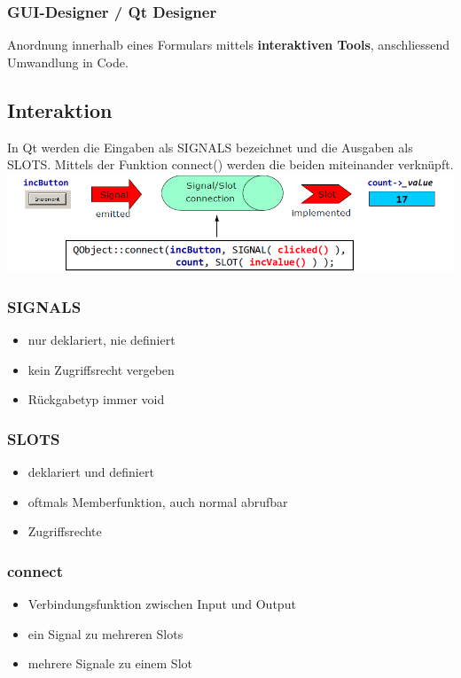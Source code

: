 \subsubsection{GUI-Designer / Qt Designer}	
	Anordnung innerhalb eines Formulars mittels\textbf{ interaktiven Tools}, anschliessend Umwandlung in Code. 	

\subsection{Interaktion}
In Qt werden die Eingaben als SIGNALS bezeichnet und die Ausgaben als SLOTS. Mittels der Funktion connect() werden die beiden miteinander verknüpft.\\
\includegraphics[width=15cm]{images/connect.png}

\begin{multicols}{3}
\subsubsection{SIGNALS}
\begin{itemize}
	\item nur deklariert, nie definiert
	\item kein Zugriffsrecht vergeben
	\item Rückgabetyp immer void
\end{itemize}

\subsubsection{SLOTS}
\begin{itemize}
	\item deklariert und definiert
	\item oftmals Memberfunktion, auch normal abrufbar
	\item Zugriffsrechte
\end{itemize}

\subsubsection{connect}
\begin{itemize}
	\item Verbindungsfunktion zwischen Input und Output
	\item ein Signal zu mehreren Slots
	\item mehrere Signale zu einem Slot
\end{itemize}
\end{multicols}

